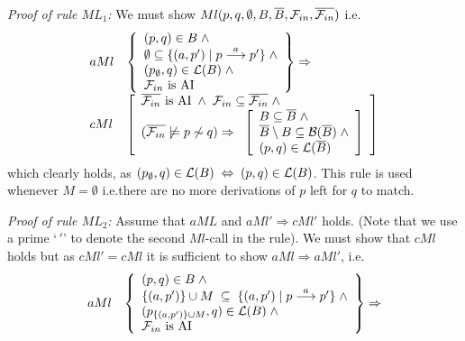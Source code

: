 \begin{theorem}[Soundness]
\begin{trivlist}
\item[\it Proof of rule\/ $ML_1$:]
We must show $Ml(p,q,\emptyset,B,\overline{B},{\cal F}_{in},\overline{{\cal F}_{in}})$ i.e.\@
\[
\begin{array}{ll}
aMl &
\left\{
\begin{array}{l}
(p,q)\in B\;\wedge\\
\emptyset\subseteq\{(a,p')\mid p\stackrel{a}{\longrightarrow}p'\}\;\wedge\\
(p_\emptyset,q)\in{\cal L}(B)\;\wedge\\
{\cal F}_{in} \mbox{ is AI}
\end{array}\right\}\Rightarrow\\

cMl &
\left[
\begin{array}{l}
\overline{{\cal F}_{in}}  \mbox{ is AI} \;\wedge\;{\cal F}_{in}\subseteq\overline{{\cal F}_{in}}\;\wedge\\
(\overline{{\cal F}_{in}}\not\models p\not\sim q)\Rightarrow\;\;
\left[
\begin{array}{l}
B\subseteq \overline{B}\; \wedge\\
\overline{B}\setminus B\subseteq {\cal B}(\overline{B})\;\wedge\\
(p,q)\in{\cal L}(\overline{B})
\end{array}
\right]
\end{array}
\right]

\end{array}
\]
which clearly holds, as $(p_\emptyset,q)\in {\cal L}(B)\;\Leftrightarrow\;(p,q)\in{\cal L}(B)$. This rule is used whenever $M=\emptyset$ i.e.\@ there are no more derivations of $p$ left for $q$ to match.


\item[\it Proof of rule\/ $ML_2$:]
Assume that $aML$ and $aMl'\Rightarrow cMl'$ holds. (Note that we use a prime `$\,{}'$' to denote the second $Ml$-call in the rule). We must show that $cMl$ holds but as $cMl' = cMl$ it is sufficient to show $aMl\Rightarrow aMl'$, i.e.\@
\[
\begin{array}{ll}
aMl &
\left\{
\begin{array}{l}
(p,q)\in B\;\wedge\\
\{(a,p')\}\cup M\;\subseteq\;\{(a,p')\mid p\stackrel{a}{\longrightarrow}p'\}\;\wedge\\
(p_{\{(a,p')\}\cup M},q)\in{\cal L}(B)\;\wedge\\
{\cal F}_{in} \mbox{ is AI}
\end{array}\right\}\Rightarrow\\


\end{array}\]
\end{trivlist}
\end{theorem}
